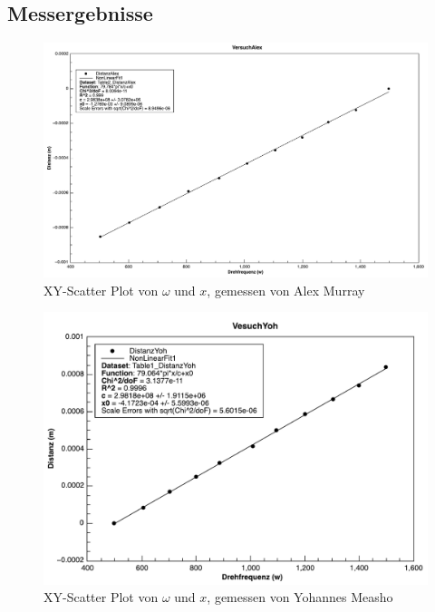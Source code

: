 \subsection{Messergebnisse}

\begin{figure}[H]
    \center
    \includegraphics[width=.8\textwidth]{images/w-x-alex.pdf}
    \caption{XY-Scatter Plot von $\omega$ und $x$, gemessen von Alex Murray}
    \label{fig:w-x-alex}
\end{figure}

\begin{figure}[H]
    \center
    \includegraphics[width=.8\textwidth]{images/w-x-yohannes.pdf}
    \caption{XY-Scatter Plot von $\omega$ und $x$, gemessen von Yohannes Measho}
    \label{fig:w-x-yohannes}
\end{figure}


